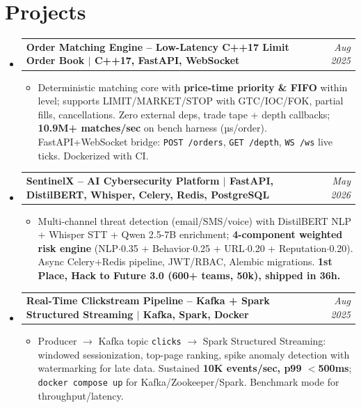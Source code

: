 \documentclass[letterpaper,10pt]{article}
\makeatletter
\newcommand{\resumeItem}[1]{\item\small{#1 \vspace{-1pt}}}
\newcommand{\resumeProjectHeading}[2]{
  \item
  \begin{tabular*}{0.97\textwidth}{l@{\extracolsep{\fill}}r}
    \small\textbf{#1} & \textit{\small #2}
  \end{tabular*}\vspace{-3pt}
}
\newcommand{\resumeSubHeadingListStart}{\begin{itemize}[leftmargin=0.15in, label={}]}
\newcommand{\resumeSubHeadingListEnd}{\end{itemize}\vspace{-2pt}}
\newcommand{\resumeItemListStart}{\begin{itemize}[leftmargin=15pt,itemsep=0pt,parsep=0pt,topsep=1pt]}
\newcommand{\resumeItemListEnd}{\end{itemize}\vspace{-4pt}}
\makeatother
\begin{document}
\section{Projects}
\resumeSubHeadingListStart

\resumeProjectHeading
  {Order Matching Engine -- Low-Latency C++17 Limit Order Book \normalfont{\small $|$ \href{https://github.com/adityashirsatrao007/order-matching-engine}{GitHub}} $|$ C++17, FastAPI, WebSocket}{Aug 2025}
  \resumeItemListStart
    \resumeItem{Deterministic matching core with \textbf{price-time priority \& FIFO} within level; supports LIMIT/MARKET/STOP with GTC/IOC/FOK, partial fills, cancellations. Zero external deps, trade tape + depth callbacks; \textbf{10.9M+ matches/sec} on bench harness (µs/order). FastAPI+WebSocket bridge: \texttt{POST /orders}, \texttt{GET /depth}, \texttt{WS /ws} live ticks. Dockerized with CI.}
  \resumeItemListEnd

\resumeProjectHeading
  {SentinelX -- AI Cybersecurity Platform \normalfont{\small $|$ \href{https://github.com/adityashirsatrao007/ai-threat-detection}{GitHub}} $|$ FastAPI, DistilBERT, Whisper, Celery, Redis, PostgreSQL}{May 2026}
  \resumeItemListStart
    \resumeItem{Multi-channel threat detection (email/SMS/voice) with DistilBERT NLP + Whisper STT + Qwen 2.5-7B enrichment; \textbf{4-component weighted risk engine} (NLP$\cdot$0.35 + Behavior$\cdot$0.25 + URL$\cdot$0.20 + Reputation$\cdot$0.20). Async Celery+Redis pipeline, JWT/RBAC, Alembic migrations. \textbf{1st Place, Hack to Future 3.0 (600+ teams, \rupee50k), shipped in 36h.}}
  \resumeItemListEnd

\resumeProjectHeading
  {Real-Time Clickstream Pipeline -- Kafka + Spark Structured Streaming \normalfont{\small $|$ \href{https://github.com/adityashirsatrao007/real-time-clickstream}{GitHub}} $|$ Kafka, Spark, Docker}{Aug 2025}
  \resumeItemListStart
    \resumeItem{Producer $\rightarrow$ Kafka topic \texttt{clicks} $\rightarrow$ Spark Structured Streaming: windowed sessionization, top-page ranking, spike anomaly detection with watermarking for late data. Sustained \textbf{10K events/sec, p99 $<$500ms}; \texttt{docker compose up} for Kafka/Zookeeper/Spark. Benchmark mode for throughput/latency.}
  \resumeItemListEnd

\resumeSubHeadingListEnd

\end{document}
